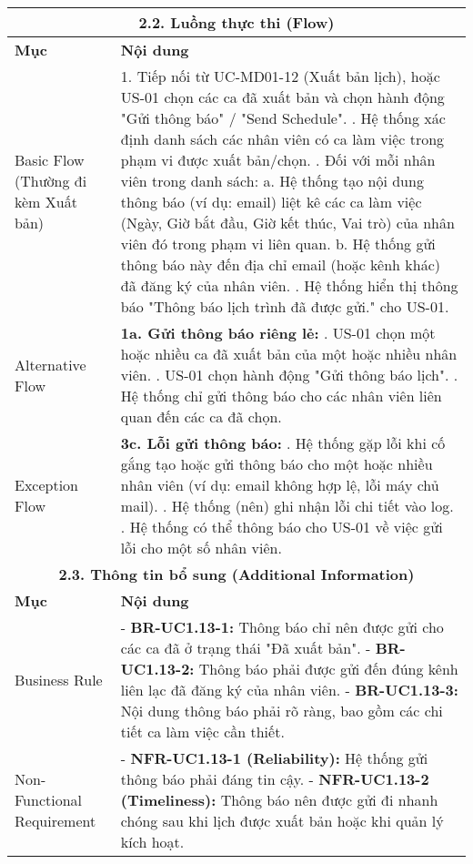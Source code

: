\begin{longtable}{|m{4cm}|p{11cm}|}
\hline
\multicolumn{2}{|c|}{\textbf{2.2. Luồng thực thi (Flow)}} \\
\hline
\textbf{Mục} & \textbf{Nội dung} \\
\hline
Basic Flow (Thường đi kèm Xuất bản) & 1. Tiếp nối từ UC-MD01-12 (Xuất bản lịch), hoặc US-01 chọn các ca đã xuất bản và chọn hành động "Gửi thông báo" / "Send Schedule". \newline 2. Hệ thống xác định danh sách các nhân viên có ca làm việc trong phạm vi được xuất bản/chọn. \newline 3. Đối với mỗi nhân viên trong danh sách: \newline    a. Hệ thống tạo nội dung thông báo (ví dụ: email) liệt kê các ca làm việc (Ngày, Giờ bắt đầu, Giờ kết thúc, Vai trò) của nhân viên đó trong phạm vi liên quan. \newline    b. Hệ thống gửi thông báo này đến địa chỉ email (hoặc kênh khác) đã đăng ký của nhân viên. \newline 4. Hệ thống hiển thị thông báo "Thông báo lịch trình đã được gửi." cho US-01. \\
\hline
Alternative Flow & \textbf{1a. Gửi thông báo riêng lẻ:} \newline    1. US-01 chọn một hoặc nhiều ca đã xuất bản của một hoặc nhiều nhân viên. \newline    2. US-01 chọn hành động "Gửi thông báo lịch". \newline    3. Hệ thống chỉ gửi thông báo cho các nhân viên liên quan đến các ca đã chọn. \\
\hline
Exception Flow & \textbf{3c. Lỗi gửi thông báo:} \newline    1. Hệ thống gặp lỗi khi cố gắng tạo hoặc gửi thông báo cho một hoặc nhiều nhân viên (ví dụ: email không hợp lệ, lỗi máy chủ mail). \newline    2. Hệ thống (nên) ghi nhận lỗi chi tiết vào log. \newline    3. Hệ thống có thể thông báo cho US-01 về việc gửi lỗi cho một số nhân viên. \\
\hline
\multicolumn{2}{|c|}{\textbf{2.3. Thông tin bổ sung (Additional Information)}} \\
\hline
\textbf{Mục} & \textbf{Nội dung} \\
\hline
Business Rule & - \textbf{BR-UC1.13-1:} Thông báo chỉ nên được gửi cho các ca đã ở trạng thái "Đã xuất bản". \newline - \textbf{BR-UC1.13-2:} Thông báo phải được gửi đến đúng kênh liên lạc đã đăng ký của nhân viên. \newline - \textbf{BR-UC1.13-3:} Nội dung thông báo phải rõ ràng, bao gồm các chi tiết ca làm việc cần thiết. \\
\hline
Non-Functional Requirement & - \textbf{NFR-UC1.13-1 (Reliability):} Hệ thống gửi thông báo phải đáng tin cậy. \newline - \textbf{NFR-UC1.13-2 (Timeliness):} Thông báo nên được gửi đi nhanh chóng sau khi lịch được xuất bản hoặc khi quản lý kích hoạt. \\
\hline
\end{longtable}

